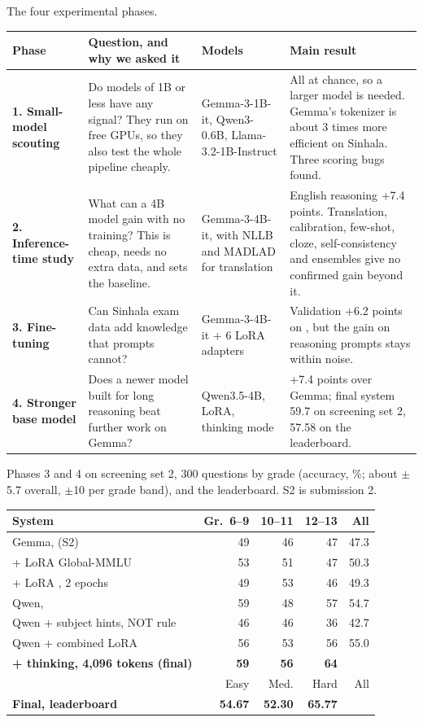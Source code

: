 \begin{center}\captionsetup{type=table}
\footnotesize
\caption{The four experimental phases.}\label{tab:phases}
\begin{tabularx}{\textwidth}{@{}L{0.14\textwidth}L{0.3\textwidth}L{0.2\textwidth}Y@{}}
\toprule
Phase & Question, and why we asked it & Models & Main result \\
\midrule
\textbf{1. Small-model scouting} & Do models of 1B or less have any signal? They run on free GPUs, so they also test the whole pipeline cheaply. & Gemma-3-1B-it, Qwen3-0.6B, Llama-3.2-1B-Instruct & All at chance, so a larger model is needed. Gemma's tokenizer is about 3 times more efficient on Sinhala. Three scoring bugs found. \\
\textbf{2. Inference-time study} & What can a 4B model gain with no training? This is cheap, needs no extra data, and sets the baseline. & Gemma-3-4B-it, with NLLB and MADLAD for translation & English reasoning +7.4 points. Translation, calibration, few-shot, cloze, self-consistency and ensembles give no confirmed gain beyond it. \\
\textbf{3. Fine-tuning} & Can Sinhala exam data add knowledge that prompts cannot? & Gemma-3-4B-it + 6 LoRA adapters & Validation +6.2 points on \sinmulu{}, but the gain on reasoning prompts stays within noise. \\
\textbf{4. Stronger base model} & Does a newer model built for long reasoning beat further work on Gemma? & Qwen3.5-4B, LoRA, thinking mode & +7.4 points over Gemma; final system 59.7 on screening set 2, 57.58 on the leaderboard. \\
\bottomrule
\end{tabularx}
\end{center}

\begin{center}\captionsetup{type=table}
\footnotesize
\caption{Phases 3 and 4 on screening set 2, 300 \sinmulu{} questions by grade (accuracy, \%; about $\pm$5.7 overall, $\pm$10 per grade band), and the leaderboard. S2 is submission 2.}\label{tab:phase2}
\begin{tabularx}{\columnwidth}{@{}Yrrrr@{}}
\toprule
System & Gr.\ 6--9 & 10--11 & 12--13 & All \\
\midrule
Gemma,  (S2) & 49 & 46 & 47 & 47.3 \\
+ LoRA Global-MMLU & 53 & 51 & 47 & 50.3 \\
+ LoRA \sinmulu{}, 2 epochs & 49 & 53 & 46 & 49.3 \\
Qwen,  & 59 & 48 & 57 & 54.7 \\
Qwen + subject hints, NOT rule & 46 & 46 & 36 & 42.7 \\
Qwen + combined LoRA & 56 & 53 & 56 & 55.0 \\
\textbf{+ thinking, 4,096 tokens (final)} & \textbf{59} & \textbf{56} & \textbf{64} &  \\
\midrule
& Easy & Med. & Hard & All \\
\midrule
\textbf{Final, leaderboard} & \textbf{54.67} & \textbf{52.30} & \textbf{65.77} &  \\
\bottomrule
\end{tabularx}
\end{center}

